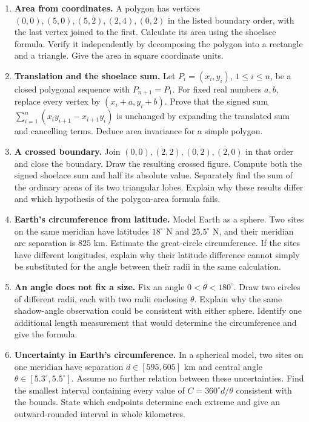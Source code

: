\begin{enumerate}
\item \textbf{Area from coordinates.} A polygon has vertices
$(0,0),(5,0),(5,2),(2,4),(0,2)$ in the listed boundary order, with the last
vertex joined to the first. Calculate its area using the shoelace formula.
Verify it independently by decomposing the polygon into a rectangle and
a triangle. Give the area in square coordinate units.

\item \textbf{Translation and the shoelace sum.} Let
$P_i=(x_i,y_i)$, $1\leq i\leq n$, be a closed polygonal sequence with
$P_{n+1}=P_1$. For fixed real numbers $a,b$, replace every vertex by
$(x_i+a,y_i+b)$. Prove that the signed sum
$\sum_{i=1}^n(x_i y_{i+1}-x_{i+1}y_i)$ is unchanged by expanding the
translated sum and cancelling terms. Deduce area invariance for a simple polygon.

\item \textbf{A crossed boundary.} Join $(0,0),(2,2),(0,2),(2,0)$ in
that order and close the boundary. Draw the resulting crossed figure.
Compute both the signed shoelace sum and half its absolute value. Separately
find the sum of the ordinary areas of its two triangular lobes. Explain
why these results differ and which hypothesis of the polygon-area formula fails.

\item \textbf{Earth's circumference from latitude.} Model Earth as a
sphere. Two sites on the same meridian have latitudes $18^\circ$ N and
$25.5^\circ$ N, and their meridian arc separation is $825$ km. Estimate
the great-circle circumference. If the sites have different longitudes,
explain why their latitude difference cannot simply be substituted for
the angle between their radii in the same calculation.

\item \textbf{An angle does not fix a size.} Fix an angle
$0<\theta<180^\circ$. Draw two circles of different radii, each with two
radii enclosing $\theta$. Explain why the same shadow-angle observation
could be consistent with either sphere. Identify one additional length
measurement that would determine the circumference and give the formula.

\item \textbf{Uncertainty in Earth's circumference.} In a spherical
model, two sites on one meridian have separation $d\in[595,605]$ km and
central angle $\theta\in[5.3^\circ,5.5^\circ]$. Assume no further relation
between these uncertainties. Find the smallest interval containing every
value of $C=360^\circ d/\theta$ consistent with the bounds. State which
endpoints determine each extreme and give an outward-rounded interval in
whole kilometres.


\end{enumerate}
